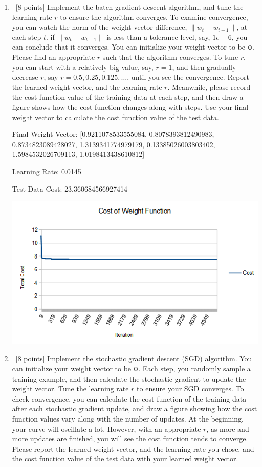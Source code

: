 \documentclass[12pt, fullpage,letterpaper]{article}
\begin{document}
\begin{enumerate}
	\begin{enumerate}
		\item~[8 points] Implement the batch gradient descent algorithm, and tune the learning rate $r$ to ensure the algorithm converges.  To examine convergence, you can watch the norm of the weight vector difference,  $\|w_{t} - w_{t-1}\|$,  at each step $t$.  if $\|w_{t} - w_{t-1}\|$ is  less than a tolerance level, say, $1e-6$, you can conclude that it converges. You can initialize your weight vector to be ${\bf 0}$.  Please find an appropriate $r$ such that the algorithm converges. To tune $r$, you can start with a relatively big value, say, $r=1$, and then gradually decrease $r$, say $r=0.5, 0.25, 0.125, \ldots$, until you see the convergence. 
		Report the learned weight vector, and the learning rate $r$. Meanwhile, please record the cost function  value of the training data at each step, and then draw a figure shows how the cost function changes along with steps. Use your final weight vector to calculate  the cost function value of the test data. 
		
		\bigskip
		
		Final Weight Vector: [0.9211078533555084, 0.8078393812490983, 0.8734823089428027, 1.3139341774979179, 0.13385026003803402, 1.5984532026709113, 1.0198413438610812]
		
		Learning Rate: 0.0145
		
		Test Data Cost: 23.360684566927414
		
		\includegraphics{batch_graph}
		
		\item~[8 points] Implement the stochastic gradient descent (SGD) algorithm. You can initialize your weight vector to be ${\bf 0}$. Each step, you randomly sample a training example, and then calculate the stochastic gradient to update the weight vector.  Tune the learning rate $r$ to ensure your SGD converges. To check convergence, you can calculate the cost function of the training data after each stochastic gradient update, and draw a figure showing how the cost function values vary along with the number of updates. At the beginning, your curve will oscillate a lot. However, with an appropriate $r$, as more and more updates are finished, you will see the cost function tends to converge. Please report the learned weight vector, and the learning rate you chose, and the cost function value of the test data with your learned weight vector.
				

\end{enumerate}
\end{enumerate}
\end{document}
